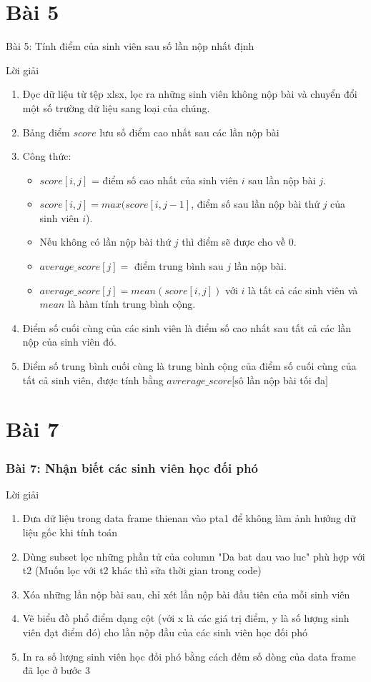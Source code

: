 \documentclass[english,10pt,table]{beamer}
\begin{document}
\section{Bài 5}
\begin{frame}{Bài 5: Tính điểm của sinh viên sau số lần nộp nhất định}
        \begin{block}{Lời giải}
        \begin{enumerate}
            \item Đọc dữ liệu từ tệp xlsx, lọc ra những sinh viên không nộp bài và chuyển đổi một số trường dữ liệu sang loại của chúng.
    \item Bảng điểm $score$ lưu số điểm cao nhất sau các lần nộp bài
     \item Công thức: 
    \begin{itemize}
        \item $score[i, j]$ = điểm số cao nhất của sinh viên $i$ sau lần nộp bài $j$.
        \item  $score[i, j] = max(score[i, j - 1]$,  điểm số sau lần nộp bài thứ $j$ của sinh viên $i$).
        \item Nếu không có lần nộp bài thứ $j$ thì điểm sẽ được cho về 0.
        \item $average\_score[j] =$ điểm trung bình sau $j$ lần nộp bài.
        \item $average\_score[j] = mean(score[i, j])$ với $i$ là tất cả các sinh viên và $mean$ là hàm tính trung bình cộng.
    \end{itemize}
    \item Điểm số cuối cùng của các sinh viên là điểm số cao nhất sau tất cả các lần nộp của sinh viên đó.
    \item Điểm số trung bình cuối cùng là trung bình cộng của điểm số cuối cùng của tất cả sinh viên, được tính bằng $avrerage\_score[$sô lần nộp bài tối đa$]$
\end{enumerate}
\end{block}
\end{frame}
\section{Bài 7}
\frame
{
    \frametitle{Bài 7: Nhận biết các sinh viên học đối phó}	
\begin{block}{Lời giải}
\begin{enumerate}
	\item  Đưa dữ liệu trong data frame thienan vào pta1 để không làm ảnh hưởng dữ liệu gốc khi tính toán
	\item Dùng subset lọc những phần tử của column "Da bat dau vao luc" phù hợp với t2 (Muốn lọc với t2 khác thì sửa thời gian trong code)
	\item Xóa những lần nộp bài sau, chỉ xét lần nộp bài đầu tiên của mỗi sinh viên
	\item Vẽ biểu đồ phổ điểm dạng cột (với x là các giá trị điểm, y là số lượng sinh viên đạt điểm đó) cho lần nộp đầu của các sinh viên học đối phó
	\item In ra số lượng sinh viên học đối phó bằng cách đếm số dòng của data frame đã lọc ở bước 3
\end{enumerate}
\end{block}
}
\end{document}
